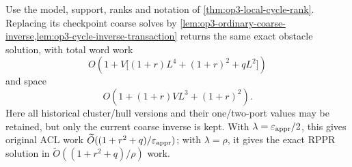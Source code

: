 \begin{theorem}
\label{thm:op3-maintained-coarse-inverse}
Use the model, support, ranks and notation of
\cref{thm:op3-local-cycle-rank}. Replacing its checkpoint coarse solves
by \cref{lem:op3-ordinary-coarse-inverse,lem:op3-cycle-inverse-transaction}
returns the same exact obstacle solution, with total word work
\begin{equation}
 O\!\left(1+V\bigl[(1+r)L^4+(1+r)^2+qL^2\bigr]\right)
 \label{eq:op3-maintained-inverse-work}
\end{equation}
and space
\begin{equation}
 O\!\left(1+(1+r)VL^3+(1+r)^2\right).
 \label{eq:op3-maintained-inverse-space}
\end{equation}
Here all historical cluster/hull versions and their one/two-port values
may be retained, but only the current coarse inverse is kept. With
$\lambda=\varepsilon_{\mathrm{appr}}/2$, this gives original ACL work
$\widetilde O((1+r^2+q)/\varepsilon_{\mathrm{appr}})$; with $\lambda=\rho$, it gives the
exact RPPR solution in $\widetilde O((1+r^2+q)/\rho)$ work.
\end{theorem}
